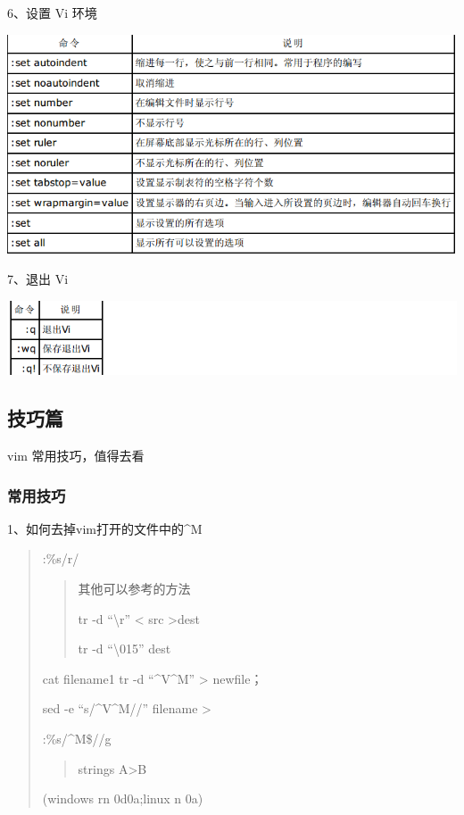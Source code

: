 \documentclass[letterpaper,10pt]{sphinxmanual}
\begin{document}
6、设置 Vi 环境

\includegraphics{setvi.png}

7、退出 Vi

\includegraphics{exitvi.png}


\subsection{技巧篇}
\label{Linux_vim/tips::doc}\label{Linux_vim/tips:id1}
vim 常用技巧，值得去看


\subsubsection{常用技巧}
\label{Linux_vim/tips:id2}
1、如何去掉vim打开的文件中的\textasciicircum{}M
\begin{quote}

:\%s/r/
\begin{quote}

其他可以参考的方法

tr -d ``\textbackslash{}r'' \textless{} src \textgreater{}dest

tr -d ``\textbackslash{}015'' dest
\end{quote}

cat filename1 \textbar{} tr -d ``\textasciicircum{}V\textasciicircum{}M'' \textgreater{} newfile；

sed -e ``s/\textasciicircum{}V\textasciicircum{}M//'' filename \textgreater{}

:\%s/\textasciicircum{}M\$//g
\begin{quote}

strings A\textgreater{}B
\end{quote}

(windows rn  0d0a;linux n 0a)
\end{quote}
\end{document}
